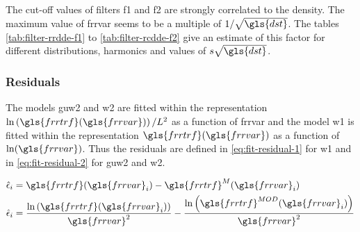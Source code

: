 \bigskip

The cut-off values of filters \gls{f1} and \gls{f2} are strongly correlated to the density.
The maximum value of \gls{frrvar} seems to be a multiple of \( 1 / \sqrt{\gls{dst}} \).
The tables \ref{tab:filter-rrdde-f1} to \ref{tab:filter-rcdde-f2} give an estimate of this factor for different distributions, harmonics and values of \( s \sqrt{\gls{dst}} \).

\bigskip

%
\label{tab:filter-rrdde-f1}

\bigskip

%
\label{tab:filter-rrdde-f2}

\bigskip

%
\label{tab:filter-rcdde-f1}

\bigskip

%
\label{tab:filter-rcdde-f2}

\subsubsection{Residuals}

The models \gls{guw2} and \gls{w2} are fitted within the representation \( \ln \left( \gls{frrtrf}(\gls{frrvar}) \right)/L^2 \) as a function of \gls{frrvar} and the model \gls{w1} is fitted within the representation \( \gls{frrtrf}(\gls{frrvar}) \) as a function of \( \ln(\gls{frrvar}) \). Thus the residuals are defined in \eqref{eq:fit-residual-1} for \gls{w1} and in \eqref{eq:fit-residual-2} for \gls{guw2} and \gls{w2}.

\begin{align}
\hat{\epsilon}_i &=
\gls{frrtrf}(\gls{frrvar}_i) - \gls{frrtrf}^{M}(\gls{frrvar}_i) \label{eq:fit-residual-1} \\
\hat{\epsilon}_i &=
\frac{\ln\left(\gls{frrtrf}(\gls{frrvar}_i)\right)}{\gls{frrvar}^2} -
\frac{\ln\left(\gls{frrtrf}^{MOD}(\gls{frrvar}_i)\right)}{\gls{frrvar}^2} \label{eq:fit-residual-2}
\end{align}

